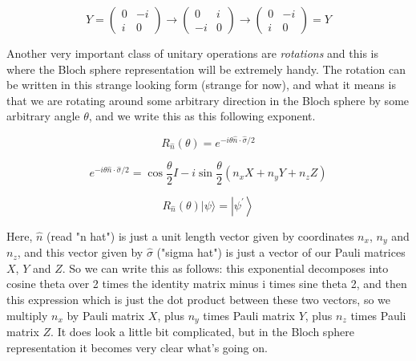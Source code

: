 \begin{equation}
Y=\left(\begin{array}{cc}
0 & -i \\
i & 0
\end{array}\right) \longrightarrow\left(\begin{array}{cc}
0 & i \\
-i & 0
\end{array}\right) \longrightarrow\left(\begin{array}{cc}
0 & -i \\
i & 0
\end{array}\right)=Y
\end{equation}

Another very important class of unitary operations are \emph{rotations} and this is where the Bloch sphere representation will be extremely handy. The rotation can be written in this strange looking form (strange for now), and what it means is that we are rotating around some arbitrary direction in the Bloch sphere by some arbitrary angle $\theta$, and we write this as this following exponent.

\begin{equation}
R_{\hat{n}}(\theta)=e^{-i \theta \hat{n} \cdot \hat{\sigma} / 2}
\end{equation}

\begin{equation}
e^{-i \theta \hat{n} \cdot \hat{\sigma} / 2 }=\cos \frac{\theta}{2} I-i \sin \frac{\theta}{2}\left(n_{x} X+n_{y} Y+n_{z} Z\right)
\end{equation}

\begin{equation}
R_{\hat{n}}(\theta)|\psi\rangle=\left|\psi^{\prime}\right\rangle
\end{equation}

Here, $\hat{n}$ (read "n hat") is just a unit length vector given by coordinates $n_x$, $n_y$ and $n_z$, and this vector given by $\hat{\sigma}$ ("sigma hat") is just a vector of our Pauli matrices $X$, $Y$ and $Z$. So we can write this as follows: this exponential decomposes into cosine theta over 2 times the identity matrix minus i times sine theta 2, and then this expression which is just the dot product between these two vectors, so we multiply $n_x$ by Pauli matrix $X$, plus $n_y$ times Pauli matrix $Y$, plus $n_z$ times Pauli matrix $Z$. It does look a little bit complicated, but in the Bloch sphere representation it becomes very clear what's going on. 


